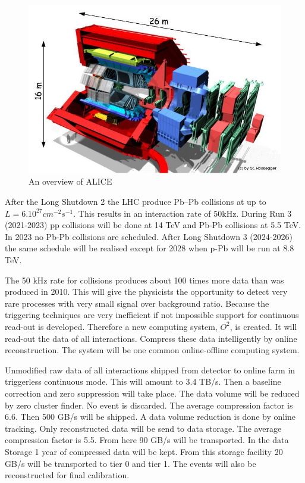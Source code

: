 \begin{figure}[h]
  \begin{center}
    \includegraphics[scale=0.4]{alice_upgrade.jpg}
    \caption{An overview of ALICE}
    \label{fig:overview}
  \end{center}
\end{figure}
After the Long Shutdown 2 the LHC produce Pb–Pb collisions at up to $L = 6.10^{27} cm^{-2} s^{-1}$. This results in an interaction rate of 50kHz. During Run 3 (2021-2023) pp collisions will be done at 14 TeV and Pb-Pb collisions at 5.5 TeV. In 2023 no Pb-Pb collisions are scheduled. After Long Shutdown 3 (2024-2026) the same schedule will be realised except for 2028 when p-Pb will be run at 8.8 TeV.

The 50 kHz rate for collisions produces about 100 times more data than was produced in 2010. This will give the physicists the opportunity to detect very rare processes with very small signal over background ratio. Because the triggering techniques are very inefficient if not impossible support for continuous read-out is developed. Therefore a new computing system, $O^2$, is created. It will read-out the data of all interactions. Compress these data intelligently by online reconstruction. The system will be one common online-offline computing system.

Unmodified raw data of all interactions shipped from detector to online farm in triggerless continuous mode. This will amount to 3.4 TB/s. Then a baseline correction and zero suppression will take place. The data volume will be reduced by zero cluster finder. No event is discarded. The average compression factor is 6.6. Then 500 GB/s will be shipped. A data volume reduction is done by online tracking. Only reconstructed data will be send to data storage. The average compression factor is 5.5. From here 90 GB/s will be transported. In the data Storage 1 year of compressed data will be kept. From this storage facility 20 GB/s will be transported to tier 0 and tier 1. The events will also be reconstructed for final calibration.

